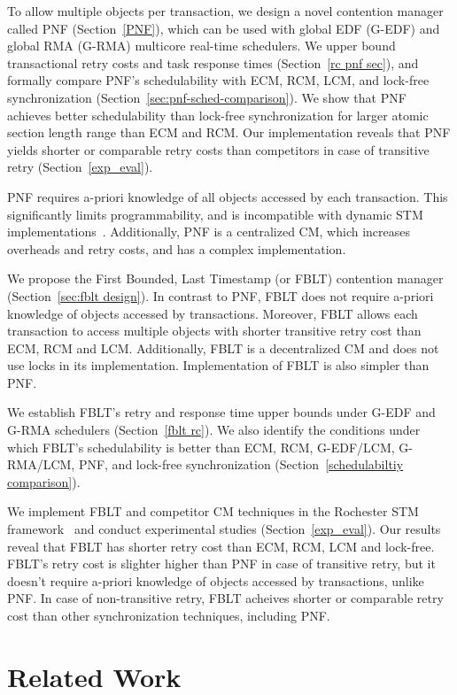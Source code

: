 \documentclass[a4paper,english]{article}
\begin{document}
To allow multiple objects per transaction, we design a novel contention manager called PNF  (Section~\ref{PNF}), which can be used with global EDF (G-EDF) and global RMA (G-RMA) multicore real-time schedulers. We upper bound transactional retry costs and task response times (Section~\ref{rc pnf sec}), and formally compare PNF's schedulability with ECM, RCM, LCM, and lock-free synchronization (Section~\ref{sec:pnf-sched-comparison}). 
We show that PNF achieves better schedulability than lock-free synchronization for larger 
atomic section length range than ECM and RCM. Our implementation reveals that PNF yields shorter or comparable retry costs than competitors in case of transitive retry (Section~\ref{exp_eval}).

PNF requires a-priori knowledge of all objects accessed by each transaction. This significantly limits programmability, and is incompatible with dynamic STM implementations~\cite{Herlihy:2003:STM:872035.872048}. Additionally, PNF is a centralized CM, which increases overheads and retry costs, and has a complex implementation. 

We propose the First Bounded, Last Timestamp (or FBLT) contention manager (Section~\ref{sec:fblt design}). In contrast to PNF, FBLT does not require a-priori knowledge of objects accessed by transactions. Moreover, FBLT allows each transaction to access multiple objects with shorter transitive retry cost than ECM, RCM and LCM. Additionally, FBLT is a decentralized CM and does not use locks in its implementation. Implementation of FBLT is also simpler than PNF. 

We establish FBLT's retry and response time upper bounds under G-EDF and G-RMA schedulers (Section~\ref{fblt rc}). We also identify the conditions under which FBLT's schedulability is better than ECM, RCM, G-EDF/LCM, G-RMA/LCM, PNF, and lock-free synchronization (Section~\ref{schedulabiltiy comparison}).

We implement FBLT and competitor CM techniques in the Rochester STM framework~\cite{marathe2006lowering} and conduct experimental studies (Section~\ref{exp_eval}). Our results reveal that FBLT has shorter retry cost than ECM, RCM, LCM and lock-free. FBLT's retry cost is slighter higher than PNF in case of transitive retry, but it doesn't require a-priori knowledge of objects accessed by transactions, unlike PNF. In case of non-transitive retry, FBLT acheives shorter or comparable retry cost than other synchronization techniques, including PNF.

\section{Related Work}
\label{sec:past}
\end{document}
